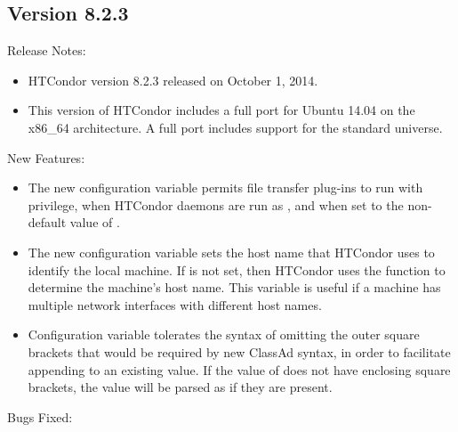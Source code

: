 \subsection*{\label{sec:New-8-2-3}Version 8.2.3}

\noindent Release Notes:

\begin{itemize}

\item HTCondor version 8.2.3 released on October 1, 2014.

\item This version of HTCondor includes a full port for 
Ubuntu 14.04 on the x86\_64 architecture.
A full port includes support for the standard universe.

\end{itemize}


\noindent New Features:

\begin{itemize}

\item The new configuration variable 
 permits file transfer
plug-ins to run with  privilege,
when HTCondor daemons are run as ,
and when set to the non-default value of .

\item The new configuration variable  sets
the host name that HTCondor uses to identify the local machine.
If  is not set, 
then HTCondor uses the  function to determine 
the machine's host name.
This variable is useful if a machine has multiple network interfaces
with different host names.

\item Configuration variable  tolerates
the syntax of omitting the outer square brackets that would be 
required by new ClassAd syntax,
in order to facilitate appending to an existing value. 
If the value of  does not have
enclosing square brackets, 
the value will be parsed as if they are present.

\end{itemize}

\noindent Bugs Fixed:

